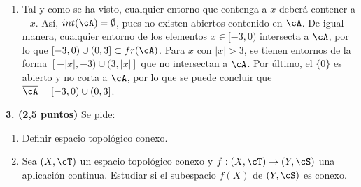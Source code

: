 \begin{solucion}
\begin{enumerate}[label=\alph*)]
        Observando cómo son los elementos de la base $\cT$, se puede apreciar que cualquier abierto que contenga a $x \neq 0$, contiene también al elemento $-x$. De esta forma, no se pueden encontrar abiertos disjuntos que contengan respectivamente a $x$ y $-x$, pues dichos abiertos son de la forma $[-b,-a) \cup (a, b]$ o de la forma $[-b,b]$. Se concluye por lo tanto que no es de Hausdorff.

        \item Tal y como se ha visto, cualquier entorno que contenga a $x$ deberá contener a $-x$. Así, $int(\cA) = \emptyset$, pues no existen abiertos contenido en $\cA$. De igual manera, cualquier entorno de los elementos $x\in[-3,0)$ intersecta a $\cA$, por lo que $ [-3,0) \cup (0,3] \subset fr(\cA)$. Para $x$ con $|x| > 3$, se tienen entornos de la forma $[-|x|,-3) \cup (3,|x|]$ que no intersectan a $\cA$. Por último, el $\{0\}$ es abierto y no corta a $\cA$, por lo que se puede concluir que $ \overline{\cA} = [-3,0) \cup (0,3]$.
    \end{enumerate}
\end{solucion}

\begin{enunciado}
    \hypertarget{2023 A 3}{}
    \textbf{3. (2,5 puntos)} Se pide:
    \begin{enumerate}[label=\alph*)]
        \item Definir espacio topológico conexo.
        \item Sea \((X,\cT)\) un espacio topológico conexo y \(f : (X,\cT) \to (Y,\cS)\) una aplicación continua. Estudiar si el subespacio \(f(X)\) de \((Y,\cS)\) es conexo.
    \end{enumerate}
\end{enunciado}

